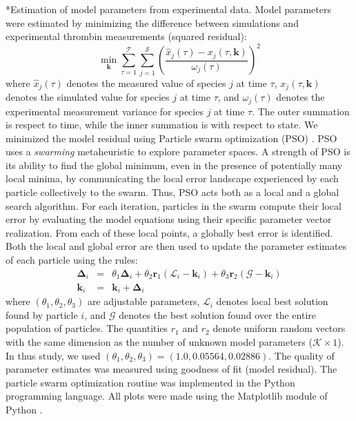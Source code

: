 \documentclass[12pt]{article}
\makeatletter
\renewcommand\subsection{\@startsection
	{subsection}{2}{0mm}
	{-0.05in}
	{-0.5\baselineskip}
	{\normalfont\normalsize\bfseries}}
\makeatother
\begin{document}
\subsection*{Estimation of model parameters from experimental data.}
Model parameters were estimated by minimizing the difference between simulations and experimental thrombin measurements (squared residual):
\begin{equation}\label{eqn:objective-function}
	\min_{\mathbf{k}} \sum_{\tau=1}^{\mathcal{T}}\sum_{j=1}^{\mathcal{S}}\left(\frac{\hat{x}_{j}\left(\tau\right) - x_{j}\left(\tau,\mathbf{k}\right)}{\omega_{j}\left(\tau\right)}\right)^{2}
\end{equation}where $\hat{x}_{j}\left(\tau\right)$ denotes the measured value of species $j$ at time $\tau$, $x_{j}\left(\tau,\mathbf{k}\right)$ denotes the simulated 
value for species $j$ at time $\tau$, and $\omega_{j}\left(\tau\right)$ denotes the experimental measurement variance for species $j$ at time $\tau$. The outer summation is respect to
time, while the inner summation is with respect to state. We minimized the model residual using Particle swarm optimization (PSO) \citep{PSO}.
PSO uses a \textit{swarming} metaheuristic to explore parameter spaces. 
A strength of PSO is its ability to find the global minimum, even in the presence of potentially many local minima, by communicating the local
error landscape experienced by each particle collectively to the swarm. Thus, PSO acts both as a local and a global search algorithm. 
For each iteration, particles in the swarm compute their local error by evaluating the model equations using their specific parameter vector realization.
From each of these local points, a globally best error is identified. Both the local and global error 
are then used to update the parameter estimates of each particle using the rules:
\begin{eqnarray}
	\mathbf{\Delta}_{i} &=&\theta_{1}\mathbf{\Delta}_{i} + \theta_{2}\mathbf{r}_{1}\left(\mathcal{L}_{i} - \mathbf{k}_{i}\right) + \theta_{3}\mathbf{r}_{2}\left(\mathcal{G} - \mathbf{k}_{i}\right) \\
	\mathbf{k}_{i} &=& \mathbf{k}_{i} + \mathbf{\Delta}_{i}
\end{eqnarray}where $\left(\theta_{1},\theta_{2},\theta_{3}\right)$ are adjustable parameters, $\mathcal{L}_{i}$ denotes local best solution found by particle $i$, and
$\mathcal{G}$ denotes the best solution found over the entire population of particles. The quantities $r_{1}$ and $r_{2}$ denote uniform random vectors with the same dimension as the number of unknown model
parameters ($\mathcal{K}\times{1}$). In thus study, we used $\left(\theta_{1},\theta_{2},\theta_{3}\right) = \left(1.0, 0.05564, 0.02886\right)$. The quality of parameter
estimates was measured using goodness of fit (model residual). The particle swarm optimization routine was implemented in the Python programming language. 
All plots were made using the Matplotlib module of Python \citep{Matplotlib}.
\end{document}
